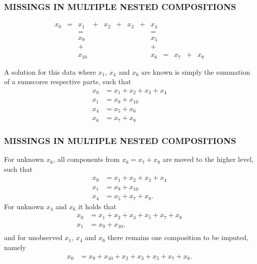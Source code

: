 \documentclass[aspectratio=169]{beamer} %
\begin{document}
\begin{frame}
  \frametitle{MISSINGS IN MULTIPLE NESTED COMPOSITIONS}
\begin{equation*}
\begin{array}{lllllllllllll}
x_0 &=	&x_1		&+	&x_2		&+		&x_3		&+& x_4	& 		& 	& 	&\\
       &  	&= 		&   	&      		& 		&  		&& =		& 		& 	&	&\\
       &  	&x_9    	&   	&      		&		& 		&& x_5	& 		& 	&	&\\
       &  	&+		&   	&      		&		& 		&& +		& 		& 	&	&\\
       &  	&x_{10} 	&   	&      		&		& 	 	&&x_6		&= 		&x_7 	&+&x_8
\end{array}
\end{equation*}

A solution for this data where $x_1$, $x_4$ and $x_6$ are known is simply the summation of a sumscores respective parts, such that
\begin{align*}
x_0 &= x_1 + x_2 + x_3 + x_4\\
x_1 &= x_9 + x_{10} \\
x_4 &= x_5 + x_6\\
x_6 &= x_7 + x_8
\end{align*}
\end{frame}

\begin{frame}
  \frametitle{MISSINGS IN MULTIPLE NESTED COMPOSITIONS}
For unknown $x_6$, all components from $x_6=x_7+x_8$ are moved to the higher level, such that
\begin{align*}
x_0 &= x_1 + x_2 +x_3 + x_4\\
x_1 &= x_9 + x_{10}\\
x_4 &= x_5 + x_7 + x_8.
\end{align*}
For unknown $x_4$ and $x_6$ it holds that
\begin{align*}
x_0 &= x_1 + x_2 +x_3 + x_5 + x_7 + x_8\\
x_1 &= x_9 + x_{10},\\
\end{align*}
and for unobserved $x_1$, $x_4$ and $x_6$ there remains one composition to be imputed, namely
\begin{align*}
x_0 &= x_9 + x_{10} + x_2 +x_3 + x_5 + x_7 + x_8.\\
\end{align*}
\end{frame}
\end{document}
